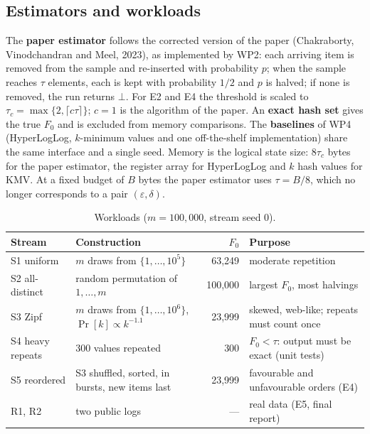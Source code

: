 \documentclass[11pt]{article}
\newcommand{\eps}{\varepsilon}
\begin{document}
\subsection{Estimators and workloads}\label{sec:estimators}

The \textbf{paper estimator} follows the corrected version of the paper
(Chakraborty, Vinodchandran and Meel, 2023), as implemented by WP2: each
arriving item is removed from the sample and re-inserted with probability $p$;
when the sample reaches $\tau$ elements, each is kept with probability $1/2$
and $p$ is halved; if none is removed, the run returns $\bot$. For E2 and E4
the threshold is scaled to $\tau_c = \max\{2, \lceil c\tau \rceil\}$; $c = 1$
is the algorithm of the paper. An \textbf{exact hash set} gives the true $F_0$
and is excluded from memory comparisons. The \textbf{baselines} of WP4
(HyperLogLog, $k$-minimum values and one off-the-shelf implementation) share
the same interface and a single seed. Memory is the logical state size:
$8\tau_c$ bytes for the paper estimator, the register array for HyperLogLog
and $k$ hash values for KMV. At a fixed budget of $B$ bytes the paper
estimator uses $\tau = B/8$, which no longer corresponds to a pair
$(\eps,\delta)$.

\begin{table}[htbp]
\centering\small
\caption{Workloads ($m = 100{,}000$, stream seed 0).}\label{tab:workloads}
\begin{tabularx}{\linewidth}{@{}lLrL@{}}
\toprule
Stream & Construction & $F_0$ & Purpose \\
\midrule
S1 uniform & $m$ draws from $\{1,\dots,10^5\}$ & 63,249 & moderate repetition \\
S2 all-distinct & random permutation of $1,\dots,m$ & 100,000 &
  largest $F_0$, most halvings \\
S3 Zipf & $m$ draws from $\{1,\dots,10^6\}$, $\Pr[k] \propto k^{-1.1}$ &
  23,999 & skewed, web-like; repeats must count once \\
S4 heavy repeats & 300 values repeated & 300 &
  $F_0 < \tau$: output must be exact (unit tests) \\
S5 reordered & S3 shuffled, sorted, in bursts, new items last & 23,999 &
  favourable and unfavourable orders (E4) \\
R1, R2 & two public logs & --- & real data (E5, final report) \\
\bottomrule
\end{tabularx}
\end{table}
\end{document}

